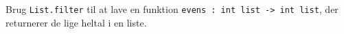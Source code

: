 Brug \lstinline{List.filter} til at lave en funktion \lstinline{evens : int list -> int list}, der returnerer de lige heltal i en liste.
